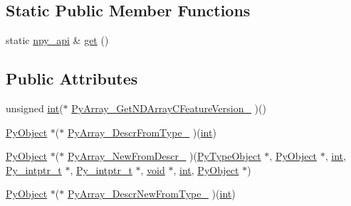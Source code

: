 \subsection*{Static Public Member Functions}
\begin{DoxyCompactItemize}
\item 
static \mbox{\hyperlink{structnpy__api}{npy\+\_\+api}} \& \mbox{\hyperlink{structnpy__api_aba897273c4b93bd10e5760f93de85aaf}{get}} ()
\end{DoxyCompactItemize}
\subsection*{Public Attributes}
\begin{DoxyCompactItemize}
\item 
unsigned \mbox{\hyperlink{warnings_8h_a74f207b5aa4ba51c3a2ad59b219a423b}{int}}($\ast$ \mbox{\hyperlink{structnpy__api_ab40ac29b4dd4d4b3ff26fca367190a0d}{Py\+Array\+\_\+\+Get\+N\+D\+Array\+C\+Feature\+Version\+\_\+}} )()
\item 
\mbox{\hyperlink{_python27_2object_8h_aadc84ac7aed2cfa6f20c25f62bf3dac7}{Py\+Object}} $\ast$($\ast$ \mbox{\hyperlink{structnpy__api_a089f8b2eff652a6be196a4a272fda631}{Py\+Array\+\_\+\+Descr\+From\+Type\+\_\+}} )(\mbox{\hyperlink{warnings_8h_a74f207b5aa4ba51c3a2ad59b219a423b}{int}})
\item 
\mbox{\hyperlink{_python27_2object_8h_aadc84ac7aed2cfa6f20c25f62bf3dac7}{Py\+Object}} $\ast$($\ast$ \mbox{\hyperlink{structnpy__api_a011738372f87b4f5c55438b36363d0e7}{Py\+Array\+\_\+\+New\+From\+Descr\+\_\+}} )(\mbox{\hyperlink{_python27_2object_8h_a42a55dd6e973872c7a6bc61632070f6f}{Py\+Type\+Object}} $\ast$, \mbox{\hyperlink{_python27_2object_8h_aadc84ac7aed2cfa6f20c25f62bf3dac7}{Py\+Object}} $\ast$, \mbox{\hyperlink{warnings_8h_a74f207b5aa4ba51c3a2ad59b219a423b}{int}}, \mbox{\hyperlink{pyport_8h_abd3f9942a9af5f7423b51d51992df0ac}{Py\+\_\+intptr\+\_\+t}} $\ast$, \mbox{\hyperlink{pyport_8h_abd3f9942a9af5f7423b51d51992df0ac}{Py\+\_\+intptr\+\_\+t}} $\ast$, \mbox{\hyperlink{_s_d_l__opengles2__gl2ext_8h_ae5d8fa23ad07c48bb609509eae494c95}{void}} $\ast$, \mbox{\hyperlink{warnings_8h_a74f207b5aa4ba51c3a2ad59b219a423b}{int}}, \mbox{\hyperlink{_python27_2object_8h_aadc84ac7aed2cfa6f20c25f62bf3dac7}{Py\+Object}} $\ast$)
\item 
\mbox{\hyperlink{_python27_2object_8h_aadc84ac7aed2cfa6f20c25f62bf3dac7}{Py\+Object}} $\ast$($\ast$ \mbox{\hyperlink{structnpy__api_ad040b3ea314996f78176f7a5ddb29177}{Py\+Array\+\_\+\+Descr\+New\+From\+Type\+\_\+}} )(\mbox{\hyperlink{warnings_8h_a74f207b5aa4ba51c3a2ad59b219a423b}{int}})

\end{DoxyCompactItemize}
